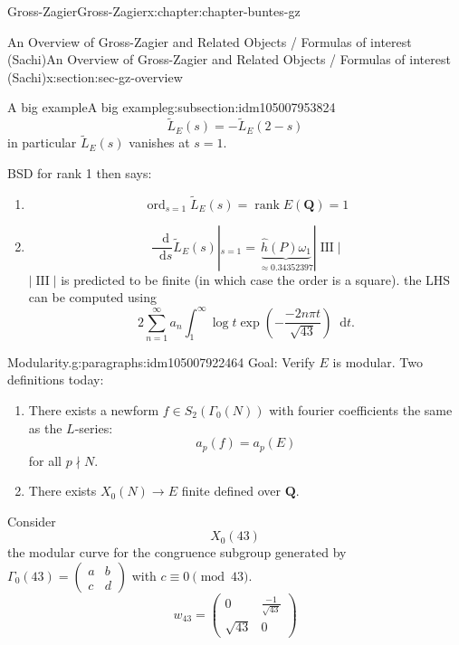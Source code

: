 \documentclass[oneside,10pt,]{book}
\numberwithin{equation}{section}
\newcommand{\diff}{\mathop{}\!\mathrm{d}}
\DeclareMathOperator{\Sha}{III}
\newcommand{\QQ}{\mathbf{Q}}
\DeclareMathOperator{\rank}{rank}
\DeclareMathOperator{\ord}{ord}
\newcommand{\amp}{&}
\begin{document}
\begin{chapterptx}{Gross-Zagier}{}{Gross-Zagier}{}{}{x:chapter:chapter-buntes-gz}
\begin{sectionptx}{An Overview of Gross-Zagier and Related Objects \slash{} Formulas of interest (Sachi)}{}{An Overview of Gross-Zagier and Related Objects \slash{} Formulas of interest (Sachi)}{}{}{x:section:sec-gz-overview}
\begin{subsectionptx}{A big example}{}{A big example}{}{}{g:subsection:idm105007953824}
\begin{equation*}
\widetilde L_E(s) = - \widetilde L_E(2-s)
\end{equation*}
in particular \(\widetilde L_E(s)\) vanishes at \(s=1\).%
\par
BSD for rank 1 then says:%
\begin{enumerate}
\item{}%
\begin{equation*}
\ord_{s=1} \widetilde L_E(s) = \rank E(\QQ) = 1
\end{equation*}
%
\item{}%
\begin{equation*}
\frac{\diff}{\diff s} \widetilde L_E(s)|_{s=1} = \underbrace{\hat h ( P) \omega _1}_{\approx 0.34352397} |\Sha|
\end{equation*}
\(|\Sha|\) is predicted to be finite (in which case the order is a square). the LHS can be computed using%
\begin{equation*}
2\sum_{n=1}^\infty  a_n \int_1^\infty  \log t \exp\left(- \frac{-2 n  \pi  t  }{\sqrt{43}}\right) \diff t\text{.}
\end{equation*}
%
\end{enumerate}
%
\begin{paragraphs}{Modularity.}{g:paragraphs:idm105007922464}%
Goal: Verify \(E\) is modular. Two definitions today:%
\begin{enumerate}
\item{}There exists a newform \(f \in S_2(\Gamma _0(N))\) with fourier coefficients the same as the \(L\)-series:%
\begin{equation*}
a_p(f) = a_p(E)
\end{equation*}
for all \(p\nmid N\).%
\item{}There exists \(X_0(N) \to E\) finite defined over \(\QQ\).%
\end{enumerate}
%
\par
Consider%
\begin{equation*}
X_0(43)
\end{equation*}
the modular curve for the congruence subgroup generated by \(\Gamma _0(43) = \begin{pmatrix} a \amp b \\ c \amp d \end{pmatrix}\) with \(c \equiv  0 \pmod{43}\).%
\begin{equation*}
w_{43} =  \begin{pmatrix} 0 \amp \frac{-1}{\sqrt{43}} \\ \sqrt{43} \amp 0\end{pmatrix}

\end{equation*}
\end{paragraphs}
\end{subsectionptx}
\end{sectionptx}
\end{chapterptx}
\end{document}
